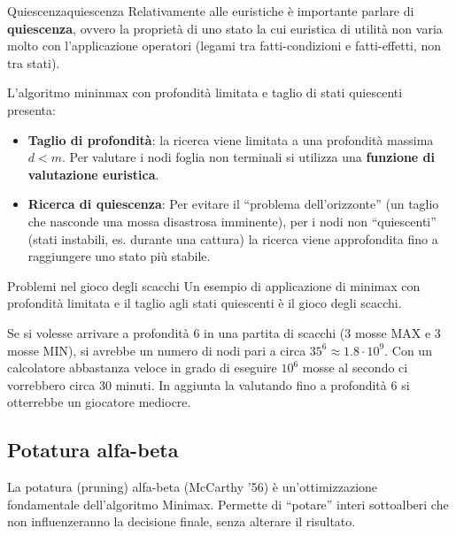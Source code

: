 \begin{definizione}{Quiescenza}{quiescenza}
    Relativamente alle euristiche è importante parlare di \textbf{quiescenza},
    ovvero la proprietà di uno stato la cui euristica di utilità non varia molto
    con l'applicazione operatori (legami tra fatti-condizioni e fatti-effetti,
    non tra stati).
\end{definizione}

L'algoritmo mininmax con profondità limitata e taglio di stati quiescenti
presenta:
\begin{itemize}
    \item \textbf{Taglio di profondità}: la ricerca viene limitata a una
    profondità massima $d < m$. Per valutare i nodi foglia non terminali
    si utilizza una \textbf{funzione di valutazione euristica}.
    \item \textbf{Ricerca di quiescenza}: Per evitare il ``problema
    dell'orizzonte'' (un taglio che nasconde una mossa disastrosa imminente),
    per i nodi non ``quiescenti'' (stati instabili, es. durante una cattura)
    la ricerca viene approfondita fino a raggiungere uno stato più stabile.
\end{itemize}

\begin{esempio}{Problemi nel gioco degli scacchi}{}
    Un esempio di applicazione di minimax con profondità limitata e il taglio
    agli stati quiescenti è il gioco degli scacchi.

    Se si volesse arrivare a profondità 6 in una partita di scacchi (3 mosse
    MAX e 3 mosse MIN), si avrebbe un numero di nodi pari a circa
    $35^6 \approx 1.8 \cdot 10^{9}$.
    Con un calcolatore abbastanza veloce in grado di eseguire $10^6$ mosse al
    secondo ci vorrebbero circa 30 minuti.
    In aggiunta la valutando fino a profondità 6 si otterrebbe un giocatore
    mediocre.
\end{esempio}

\subsection{Potatura alfa-beta}

La potatura (pruning) alfa-beta (McCarthy ’56) è un'ottimizzazione fondamentale
dell'algoritmo Minimax. Permette di ``potare'' interi sottoalberi che non
influenzeranno la decisione finale, senza alterare il risultato.

